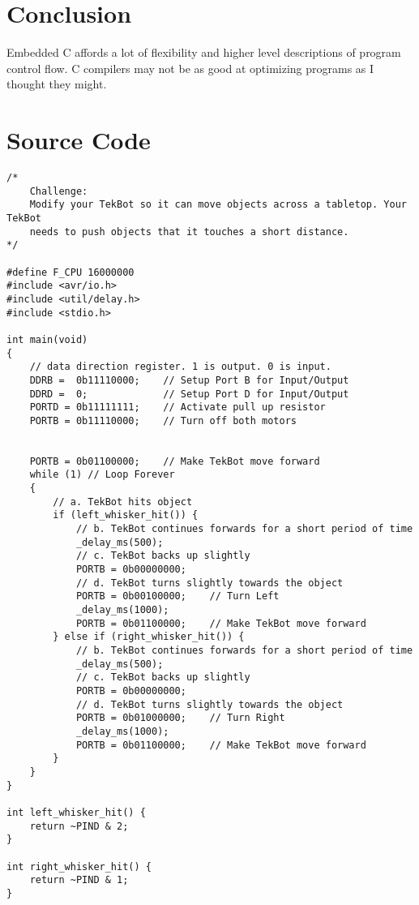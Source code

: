 \documentclass[12pt,letterpaper]{article}
\begin{document}
\section{Conclusion}
Embedded C affords a lot of flexibility and higher level descriptions of
program control flow. C compilers may not be as good at optimizing programs as
I thought they might.


\section{Source Code}
\begin{verbatim}
/*
    Challenge:
    Modify your TekBot so it can move objects across a tabletop. Your TekBot
    needs to push objects that it touches a short distance. 
*/

#define F_CPU 16000000
#include <avr/io.h>
#include <util/delay.h>
#include <stdio.h>

int main(void)
{
    // data direction register. 1 is output. 0 is input.
    DDRB =  0b11110000;    // Setup Port B for Input/Output
    DDRD =  0;             // Setup Port D for Input/Output
    PORTD = 0b11111111;    // Activate pull up resistor
    PORTB = 0b11110000;    // Turn off both motors


    PORTB = 0b01100000;    // Make TekBot move forward
    while (1) // Loop Forever
    {
        // a. TekBot hits object
        if (left_whisker_hit()) {
            // b. TekBot continues forwards for a short period of time
            _delay_ms(500);
            // c. TekBot backs up slightly
            PORTB = 0b00000000;
            // d. TekBot turns slightly towards the object
            PORTB = 0b00100000;    // Turn Left
            _delay_ms(1000);
            PORTB = 0b01100000;    // Make TekBot move forward
        } else if (right_whisker_hit()) {
            // b. TekBot continues forwards for a short period of time
            _delay_ms(500);
            // c. TekBot backs up slightly
            PORTB = 0b00000000;
            // d. TekBot turns slightly towards the object
            PORTB = 0b01000000;    // Turn Right
            _delay_ms(1000);
            PORTB = 0b01100000;    // Make TekBot move forward
        }
    }
}

int left_whisker_hit() {
    return ~PIND & 2;
}

int right_whisker_hit() {
    return ~PIND & 1;
}
\end{verbatim}
\end{document}
